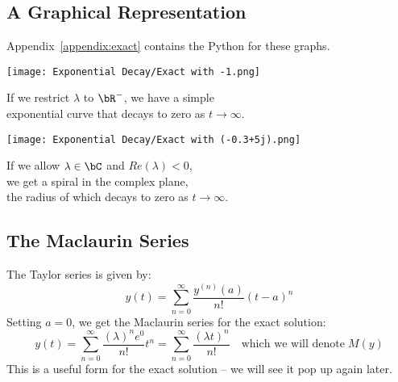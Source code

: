 \subsection{A Graphical Representation}
Appendix~\ref{appendix:exact} contains the Python for these graphs.
\begin{multicols}{2}
\begin{center}
\texttt{[image: Exponential Decay/Exact with -1.png]}
\end{center}
\par \hspace*{1cm} If we restrict $\lambda$ to $\bR^{-}$, we have a simple\\
\hspace*{1cm} exponential curve that decays to zero as $t \rightarrow \infty$.\\
\columnbreak{}
\begin{center}
\texttt{[image: Exponential Decay/Exact with (-0.3+5j).png]}
\end{center}
\par \hspace*{1cm} If we allow $\lambda \in \bC$ and $Re(\lambda)<0$,\\
\hspace*{1cm} we get a spiral in the complex plane,\\
\hspace*{1cm} the radius of which decays to zero as $t \rightarrow \infty$.\\
\end{multicols}

\subsection{The Maclaurin Series}
The Taylor series is given by:
\[y(t) = \sum\limits_{n=0}^{\infty} \frac{{y}^{(n)}(a)}{n!}{(t-a)}^n\]
Setting $a=0$, we get the Maclaurin series for the exact solution:
\[y(t) = \sum\limits_{n=0}^{\infty} \frac{{(\lambda)}^n e^0}{n!}t^n = \sum\limits_{n=0}^{\infty} \frac{{(\lambda t)}^n}{n!} \quad\text{which we will denote}\; M(y)\]
This is a useful form for the exact solution -- we will see it pop up again later.

